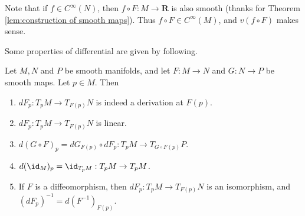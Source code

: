 \begin{remark}
    Note that if $f \in C^{\infty}(N)$, then $f \circ F : M \to \mathbf{R}$ is also smooth (thanks for Theorem \ref{lem:construction of smooth maps}). Thus $f \circ F \in C^\infty(M)$, and $v(f \circ F)$ makes sense.
\end{remark}


Some properties of differential are given by following.

\begin{proposition}\label{lem:property of differential}
    Let $M, N$ and $P$ be smooth manifolds, and let $F : M \to N$ and $G : N \to P$ be smooth maps. Let $p \in M$. Then
    \begin{enumerate}
        \item $dF_p : T_pM \to T_{F(p)}N$ is indeed a derivation at $F(p)$.
        \item $dF_p : T_pM \to T_{F(p)}N$ is linear.
        \item $d(G \circ F)_p = dG_{F(p)} \circ dF_p : T_pM \to T_{G \circ F(p)}P$.
        \item $d(\id_M)_p = \id_{T_pM} : T_pM \to T_pM$.
        \item If $F$ is a diffeomorphism, then $dF_p : T_pM \to T_{F(p)}N$ is an isomorphism, and $(dF_p)^{-1} = d(F^{-1})_{F(p)}$.
    \end{enumerate}
\end{proposition}

